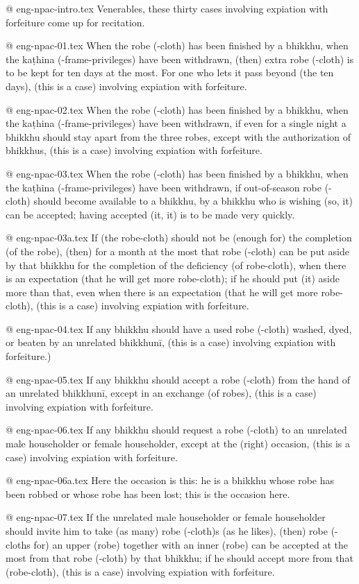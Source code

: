 @ eng-npac-intro.tex
Venerables, these thirty cases involving expiation with forfeiture come up for recitation.

@ eng-npac-01.tex
When the robe (-cloth) has been finished by a bhikkhu, when the kaṭhina (-frame-privileges) have been withdrawn, (then) extra robe (-cloth) is to be kept for ten days at the most. For one who lets it pass beyond (the ten days), (this is a case) involving expiation with forfeiture.

@ eng-npac-02.tex
When the robe (-cloth) has been finished by a bhikkhu, when the kaṭhina (-frame-privileges) have been withdrawn, if even for a single night a bhikkhu should stay apart from the three robes, except with the authorization of bhikkhus, (this is a case) involving expiation with forfeiture.

@ eng-npac-03.tex
When the robe (-cloth) has been finished by a bhikkhu, when the kaṭhina (-frame-privileges) have been withdrawn, if out-of-season robe (-cloth) should become available to a bhikkhu, by a bhikkhu who is wishing (so, it) can be accepted; having accepted (it, it) is to be made very quickly.

@ eng-npac-03a.tex
If (the robe-cloth) should not be (enough for) the completion (of the robe), (then) for a month at the most that robe (-cloth) can be put aside by that bhikkhu for the completion of the deficiency (of robe-cloth), when there is an expectation (that he will get more robe-cloth); if he should put (it) aside more than that, even when there is an expectation (that he will get more robe-cloth), (this is a case) involving expiation with forfeiture.

@ eng-npac-04.tex
If any bhikkhu should have a used robe (-cloth) washed, dyed, or beaten by an unrelated bhikkhunī, (this is a case) involving expiation with forfeiture.)

@ eng-npac-05.tex
If any bhikkhu should accept a robe (-cloth) from the hand of an unrelated bhikkhunī, except in an exchange (of robes), (this is a case) involving expiation with forfeiture.

@ eng-npac-06.tex
If any bhikkhu should request a robe (-cloth) to an unrelated male householder or female householder, except at the (right) occasion, (this is a case) involving expiation with forfeiture.

@ eng-npac-06a.tex
Here the occasion is this: he is a bhikkhu whose robe has been robbed or whose robe has been lost; this is the occasion here.

@ eng-npac-07.tex
If the unrelated male householder or female householder should invite him to take (as many) robe (-cloth)s (as he likes), (then) robe (-cloths for) an upper (robe) together with an inner (robe) can be accepted at the most from that robe (-cloth) by that bhikkhu; if he should accept more from that (robe-cloth), (this is a case) involving expiation with forfeiture.

